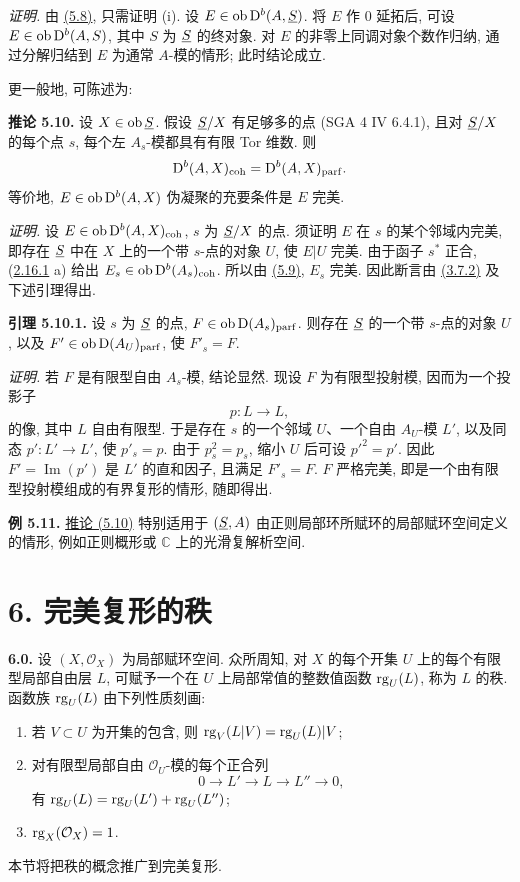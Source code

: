 \emph{证明.} 由 \hyperlink{sga6.e01.thm.5-8}{(5.8)}, 只需证明 (i). 设 \(E\in\operatorname{ob}\mathrm D^b(A,\underline S)\). 将 \(E\) 作 \(0\) 延拓后, 可设 \(E\in\operatorname{ob}\mathrm D^b(A,S)\), 其中 \(S\) 为 \(\underline S\) 的终对象. 对 \(E\) 的非零上同调对象个数作归纳, 通过分解归结到 \(E\) 为通常 \(A\)-模的情形; 此时结论成立.

更一般地, 可陈述为:

\textbf{推论 5.10.} 设 \(X\in\operatorname{ob}\underline S\). 假设 \(\underline S/X\) 有足够多的点 (SGA 4 IV 6.4.1), 且对 \(\underline S/X\) 的每个点 \(s\), 每个左 \(A_s\)-模都具有有限 Tor 维数. 则
\[
  \mathrm D^b(A,X)_{\mathrm{coh}}=\mathrm D^b(A,X)_{\mathrm{parf}}.
\]
等价地, \(E\in\operatorname{ob}\mathrm D^b(A,X)\) 伪凝聚的充要条件是 \(E\) 完美.

\emph{证明.} 设 \(E\in\operatorname{ob}\mathrm D^b(A,X)_{\mathrm{coh}}\), \(s\) 为 \(\underline S/X\) 的点. 须证明 \(E\) 在 \(s\) 的某个邻域内完美, 即存在 \(\underline S\) 中在 \(X\) 上的一个带 \(s\)-点的对象 \(U\), 使 \(E|U\) 完美. 由于函子 \(s^*\) 正合, (\hyperlink{sga6.e01.cor.2-16-1}{2.16.1} a) 给出 \(E_s\in\operatorname{ob}\mathrm D^b(A_s)_{\mathrm{coh}}\). 所以由 \hyperlink{sga6.e01.cor.5-9}{(5.9)}, \(E_s\) 完美. 因此断言由 \hyperlink{sga6.e01.cor.3-7-2}{(3.7.2)} 及下述引理得出.

\textbf{引理 5.10.1.} 设 \(s\) 为 \(\underline S\) 的点, \(F\in\operatorname{ob}\mathrm D(A_s)_{\mathrm{parf}}\). 则存在 \(\underline S\) 的一个带 \(s\)-点的对象 \(U\), 以及 \(F'\in\operatorname{ob}\mathrm D(A_U)_{\mathrm{parf}}\), 使 \(F'_s=F\).

\emph{证明.} 若 \(F\) 是有限型自由 \(A_s\)-模, 结论显然. 现设 \(F\) 为有限型投射模, 因而为一个投影子
\[
  p:L\longrightarrow L,
\]
的像, 其中 \(L\) 自由有限型. 于是存在 \(s\) 的一个邻域 \(U\)、一个自由 \(A_U\)-模 \(L'\), 以及同态 \(p':L'\to L'\), 使 \(p'_s=p\). 由于 \(p_s^2=p_s\), 缩小 \(U\) 后可设 \(p'^2=p'\). 因此 \(F'=\operatorname{Im}(p')\) 是 \(L'\) 的直和因子, 且满足 \(F'_s=F\). \(F\) 严格完美, 即是一个由有限型投射模组成的有界复形的情形, 随即得出.

\textbf{例 5.11.} \hyperlink{sga6.e01.cor.5-10}{推论 (5.10)} 特别适用于 \((\underline S,A)\) 由正则局部环所赋环的局部赋环空间定义的情形, 例如正则概形或 \(\mathbb C\) 上的光滑复解析空间.

\section*{6. 完美复形的秩}

\textbf{6.0.} 设 \((X,\mathcal O_X)\) 为局部赋环空间. 众所周知, 对 \(X\) 的每个开集 \(U\) 上的每个有限型局部自由层 \(L\), 可赋予一个在 \(U\) 上局部常值的整数值函数 \(\operatorname{rg}_U(L)\), 称为 \(L\) 的秩. 函数族 \(\operatorname{rg}_U(L)\) 由下列性质刻画:
\begin{enumerate}[label=(\roman*)]
\item 若 \(V\subset U\) 为开集的包含, 则 \(\operatorname{rg}_V(L|V)=\operatorname{rg}_U(L)|V\);
\item 对有限型局部自由 \(\mathcal O_U\)-模的每个正合列
\[
  0\longrightarrow L'\longrightarrow L\longrightarrow L''\longrightarrow 0,
\]
有 \(\operatorname{rg}_U(L)=\operatorname{rg}_U(L')+\operatorname{rg}_U(L'')\);
\item \(\operatorname{rg}_X(\mathcal O_X)=1\).
\end{enumerate}
本节将把秩的概念推广到完美复形.

